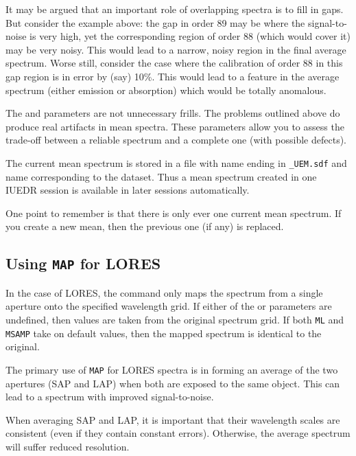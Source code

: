 It may be argued that an important role of overlapping spectra is to fill in
gaps.  But consider the example above: the gap in order 89 may be where the
signal-to-noise is very high, yet the corresponding region of order 88
(which would cover it) may be very noisy.  This would lead to a narrow, noisy
region in the final average spectrum.  Worse still, consider the case
where the calibration of order 88 in this gap region is in error by (say)
10\%\@.  This would lead to a feature in the average spectrum (either
emission or absorption) which would be totally anomalous.

The 
 and 
 parameters are not unnecessary frills.
The problems outlined above do produce real artifacts in mean spectra.  These
parameters allow you to assess the trade-off between a reliable spectrum and a
complete one (with possible defects)\@.

The current mean spectrum is stored in a file with name ending in
\verb+_UEM.sdf+ and name corresponding to the dataset.
Thus a mean spectrum created in one IUEDR session is available in later
sessions automatically.

One point to remember is that there is only ever one current mean spectrum.  If
you create a new mean, then the previous one (if any) is replaced.


\subsection{Using {\tt MAP} for LORES}

In the case of LORES, the 
 command only maps the spectrum from a
single aperture onto the specified wavelength grid.  If either of the
 or 
 parameters are undefined, then values are taken from the
original spectrum grid.  If both \verb+ML+ and \verb+MSAMP+ take on default
values, then the mapped spectrum is identical to the original.

The primary use of \verb+MAP+ for LORES spectra is in forming an average of
the two apertures (SAP and LAP) when both are exposed to the same object. This
can lead to a spectrum with improved signal-to-noise.

When averaging SAP and LAP, it is important that their wavelength scales are
consistent (even if they contain constant errors).  Otherwise, the average
spectrum will suffer reduced resolution.

